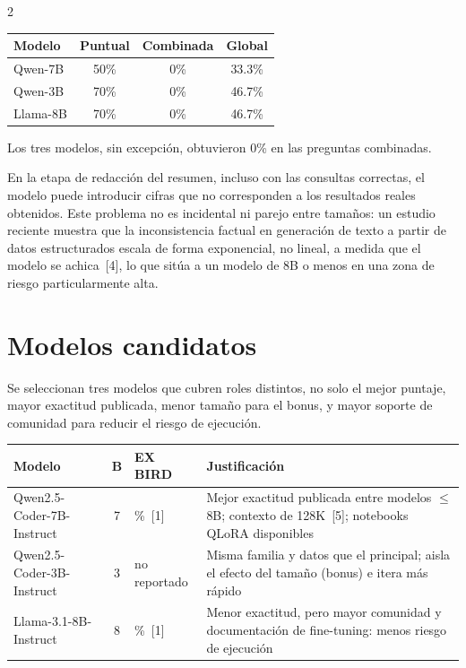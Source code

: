 \documentclass[10pt]{article}
\begin{document}
\begin{multicols}{2}
\begin{center}
\footnotesize
\begin{tabular}{@{}lccc@{}}
\toprule
\textbf{Modelo} & \textbf{Puntual} & \textbf{Combinada} & \textbf{Global} \\
\midrule
Qwen-7B & 50\% & 0\% & 33.3\% \\
Qwen-3B & 70\% & 0\% & 46.7\% \\
Llama-8B & 70\% & 0\% & 46.7\% \\
\bottomrule
\end{tabular}
\end{center}

Los tres modelos, sin excepci\'on, obtuvieron 0\% en las preguntas combinadas.

En la etapa de redacci\'on del resumen, incluso con las consultas correctas, el modelo puede introducir cifras que no corresponden a los resultados reales obtenidos. Este problema no es incidental ni parejo entre tama\~nos: un estudio reciente muestra que la inconsistencia factual en generaci\'on de texto a partir de datos estructurados escala de forma exponencial, no lineal, a medida que el modelo se achica~[4], lo que sit\'ua a un modelo de 8B o menos en una zona de riesgo particularmente alta.

\section{Modelos candidatos}
Se seleccionan tres modelos que cubren roles distintos, no solo el mejor puntaje, mayor exactitud publicada, menor tama\~no para el bonus, y mayor soporte de comunidad para reducir el riesgo de ejecuci\'on.
\begin{center}
\small
\begin{tabular}{@{}>{\raggedright\arraybackslash}p{2.3cm}c>{\raggedright\arraybackslash}p{1.15cm}>{\raggedright\arraybackslash}p{3.55cm}@{}}
\toprule
\textbf{Modelo} & \textbf{B} & \textbf{EX BIRD} & \textbf{Justificaci\'on} \\
\midrule
Qwen2.5-Coder-7B-Instruct & 7 & 50.9\%~[1] & Mejor exactitud publicada entre modelos $\leq$8B; contexto de 128K~[5]; notebooks QLoRA disponibles \\
\addlinespace
Qwen2.5-Coder-3B-Instruct & 3 & no reportado & Misma familia y datos que el principal; aisla el efecto del tama\~no (bonus) e itera m\'as r\'apido \\
\addlinespace
Llama-3.1-8B-Instruct & 8 & 42.0\%~[1] & Menor exactitud, pero mayor comunidad y documentaci\'on de fine-tuning: menos riesgo de ejecuci\'on \\
\bottomrule
\end{tabular}
\end{center}


\end{multicols}
\end{document}
